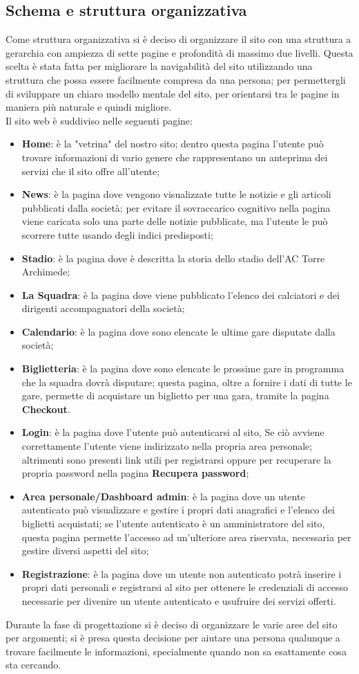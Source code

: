     \subsection{Schema e struttura organizzativa}
    Come struttura organizzativa si è deciso di organizzare il sito con una struttura a gerarchia con ampiezza di sette pagine e profondità di massimo due livelli. Questa scelta è stata fatta per migliorare la navigabilità del sito utilizzando una struttura che possa essere facilmente compresa da una persona; per permettergli di sviluppare un chiaro modello mentale del sito, per orientarsi tra le pagine in maniera più naturale e quindi migliore.\\
    Il sito web è suddiviso nelle seguenti pagine:
    \begin{itemize}
        \item \textbf{Home}: è la "vetrina" del nostro sito; dentro questa pagina l'utente può trovare informazioni di vario genere che rappresentano un anteprima dei servizi che il sito offre all'utente;
        \item \textbf{News}: è la pagina dove vengono visualizzate tutte le notizie e gli articoli pubblicati dalla società; per evitare il sovraccarico cognitivo nella pagina viene caricata solo una parte delle notizie pubblicate, ma l'utente le può scorrere tutte usando degli indici predisposti;
        \item \textbf{Stadio}: è la pagina dove è descritta la storia dello stadio dell'AC Torre Archimede;
        \item \textbf{La Squadra}: è la pagina dove viene pubblicato l'elenco dei calciatori e dei dirigenti accompagnatori della società;
        \item \textbf{Calendario}: è la pagina dove sono elencate le ultime gare disputate dalla società;
        \item \textbf{Biglietteria}: è la pagina dove sono elencate le prossime gare in programma che la squadra dovrà disputare; questa pagina, oltre a fornire i dati di tutte le gare, permette di acquistare un biglietto per una gara, tramite la pagina \textbf{Checkout}.
        \item \textbf{Login}: è la pagina dove l'utente può autenticarsi al sito, Se ciò avviene correttamente l'utente viene indirizzato nella propria area personale; altrimenti sono presenti link utili per registrarsi oppure per recuperare la propria password nella pagina \textbf{Recupera password};
        \item \textbf{Area personale/Dashboard admin}: è la pagina dove un utente autenticato può visualizzare e gestire i propri dati anagrafici e l'elenco dei biglietti acquistati; se l'utente autenticato è un amministratore del sito, questa pagina permette l'accesso ad un'ulteriore area riservata, necessaria per gestire diversi aspetti del sito;
        \item \textbf{Registrazione}: è la pagina dove un utente non autenticato potrà inserire i propri dati personali e registrarsi al sito per ottenere le credenziali di accesso necessarie per divenire un utente autenticato e usufruire dei servizi offerti.
    \end{itemize}
    \noindent
    Durante la fase di progettazione si è deciso di organizzare le varie aree del sito per argomenti; si è presa questa decisione per aiutare una persona qualunque a trovare facilmente le informazioni, specialmente quando non sa esattamente cosa sta cercando.